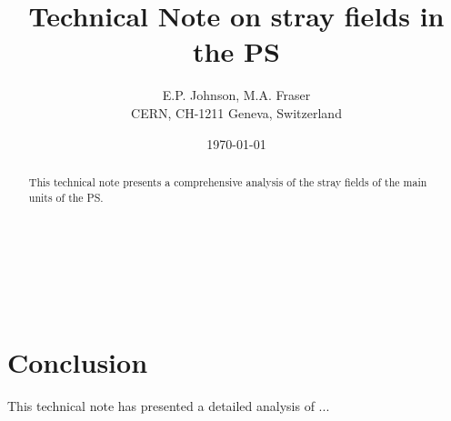\documentclass{cernatsnote}
\title{Technical Note on stray fields in the PS}
\author{
	E.P. Johnson, M.A. Fraser\; \\		
	CERN, CH-1211 Geneva, Switzerland
}
\date{\today}
\begin{document}
\maketitle

\begin{abstract}
This technical note presents a comprehensive analysis of the stray fields of the main units of the PS.

\end{abstract}
\\ \\ \\ 
\newpage

\begingroup
\color{black}
\tableofcontents
\endgroup

\pagebreak














\section{Conclusion}
This technical note has presented a detailed analysis of ...



\end{document}
